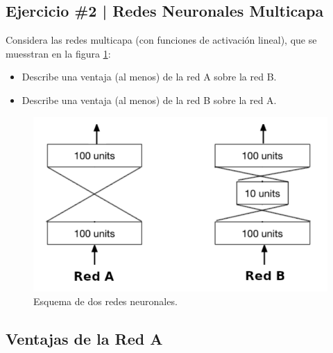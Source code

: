 \newpage

\begin{myblock}
\section*{Ejercicio \#2 | Redes Neuronales Multicapa}

Considera las redes multicapa (con funciones de activación lineal), 
que se muesstran en la figura \ref{fig:redA_redB}:

\begin{itemize}
    \item Describe una ventaja (al menos) de la red A sobre la red B.
    \item Describe una ventaja (al menos) de la red B sobre la red A.
\end{itemize}

\end{myblock}


\begin{figure}[h!]
    \centering
    \includegraphics[width=0.8\linewidth]{Images/redA-redB.png}
    \caption{Esquema de dos redes neuronales.}
    \label{fig:redA_redB}
\end{figure}



\subsection{Ventajas de la Red A}

